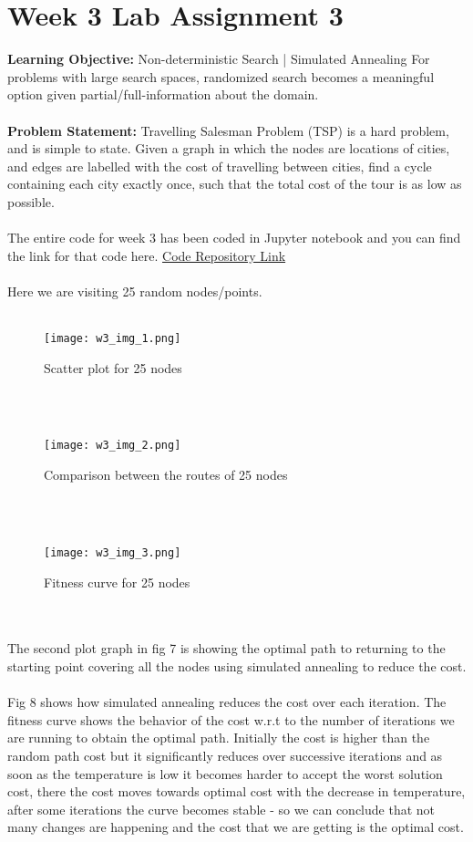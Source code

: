 \documentclass[conference]{IEEEtran}
\begin{document}
\section{Week 3 Lab Assignment 3}
\textbf{Learning Objective:} 
Non-deterministic Search | Simulated
Annealing For problems with large search spaces, randomized search becomes a meaningful option given partial/full-information about the domain.
\\
\\
\textbf{Problem Statement:}
Travelling Salesman Problem (TSP) is a hard problem, and is simple to state. Given a graph in which the nodes are locations of cities, and edges are labelled with the cost of travelling between cities, find a cycle containing each city exactly once, such that the total cost of the tour is as low as possible.
\\
\\
The entire code for week 3 has been coded in Jupyter notebook and you can find the link for that code here.
\href{https://github.com/darshh311/CS362_lab}{Code Repository Link}
\\
\\
Here we are visiting 25 random nodes/points.
\\
\\
\begin{figure}[htbp]
\centerline{\texttt{[image: w3\_img\_1.png]}}
\caption{Scatter plot for 25 nodes}
\label{fig}
\end{figure}
\\
\\
\begin{figure}[htbp]
\centerline{\texttt{[image: w3\_img\_2.png]}}
\caption{Comparison between the routes of 25 nodes}
\label{fig}
\end{figure}
\\
\\
\begin{figure}[htbp]
\centerline{\texttt{[image: w3\_img\_3.png]}}
\caption{Fitness curve for 25 nodes}
\label{fig}
\end{figure}
\\
\\

The second plot graph in fig 7 is showing the optimal path to returning to the starting point covering all the nodes using simulated annealing to reduce the cost.
\\
\\
Fig 8 shows how simulated annealing reduces the cost over each iteration. The fitness curve shows the behavior of the cost w.r.t to the number of iterations we are running to obtain the optimal path. Initially the cost is higher than the random path cost but it significantly reduces over successive iterations and as soon as the temperature is low it becomes harder to accept the worst solution cost, there the cost moves towards optimal cost with the decrease in temperature, after some iterations the curve becomes stable - so we can conclude that not many changes are happening and the cost that we are getting is the optimal cost.
\end{document}
